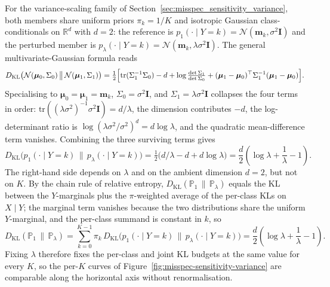 For the variance-scaling family of Section~\ref{sec:misspec_sensitivity_variance}, both members share uniform priors $\pi_k = 1/K$ and isotropic Gaussian class-conditionals on $\mathbb{R}^d$ with $d = 2$: the reference is $p_1(\cdot \mid Y{=}k) = \mathcal{N}(\mathbf{m}_k, \sigma^2 \mathbf{I})$ and the perturbed member is $p_\lambda(\cdot \mid Y{=}k) = \mathcal{N}(\mathbf{m}_k, \lambda\sigma^2 \mathbf{I})$. The general multivariate-Gaussian formula reads
\begin{equation}\label{eq:kl_gaussian_general}
    D_{\mathrm{KL}}\bigl(\mathcal{N}(\boldsymbol{\mu}_0, \Sigma_0) \,\big\|\, \mathcal{N}(\boldsymbol{\mu}_1, \Sigma_1)\bigr) = \tfrac{1}{2}\Bigl[\mathrm{tr}(\Sigma_1^{-1}\Sigma_0) - d + \log\tfrac{\det \Sigma_1}{\det \Sigma_0} + (\boldsymbol{\mu}_1 - \boldsymbol{\mu}_0)^\top \Sigma_1^{-1}(\boldsymbol{\mu}_1 - \boldsymbol{\mu}_0)\Bigr].
\end{equation}
Specialising to $\boldsymbol{\mu}_0 = \boldsymbol{\mu}_1 = \mathbf{m}_k$, $\Sigma_0 = \sigma^2 \mathbf{I}$, and $\Sigma_1 = \lambda\sigma^2 \mathbf{I}$ collapses the four terms in order: $\mathrm{tr}((\lambda\sigma^2)^{-1}\sigma^2 \mathbf{I}) = d/\lambda$, the dimension contributes $-d$, the log-determinant ratio is $\log(\lambda\sigma^2/\sigma^2)^d = d\log\lambda$, and the quadratic mean-difference term vanishes. Combining the three surviving terms gives
\begin{equation}\label{eq:kl_variance_perclass}
    D_{\mathrm{KL}}\bigl(p_1(\cdot \mid Y{=}k) \,\big\|\, p_\lambda(\cdot \mid Y{=}k)\bigr) = \tfrac{1}{2}\bigl(d/\lambda - d + d\log\lambda\bigr) = \frac{d}{2}\left(\log \lambda + \frac{1}{\lambda} - 1\right).
\end{equation}
The right-hand side depends on $\lambda$ and on the ambient dimension $d = 2$, but not on $K$. By the chain rule of relative entropy, $D_{\mathrm{KL}}(\mathbb{P}_1 \,\|\, \mathbb{P}_\lambda)$ equals the KL between the $Y$-marginals plus the $\pi$-weighted average of the per-class KLs on $X \mid Y$; the marginal term vanishes because the two distributions share the uniform $Y$-marginal, and the per-class summand is constant in $k$, so
\begin{equation}\label{eq:kl_variance_joint}
    D_{\mathrm{KL}}(\mathbb{P}_1 \,\|\, \mathbb{P}_\lambda) = \sum_{k=0}^{K-1} \pi_k\, D_{\mathrm{KL}}\bigl(p_1(\cdot \mid Y{=}k) \,\big\|\, p_\lambda(\cdot \mid Y{=}k)\bigr) = \frac{d}{2}\left(\log \lambda + \frac{1}{\lambda} - 1\right).
\end{equation}
Fixing $\lambda$ therefore fixes the per-class and joint KL budgets at the same value for every $K$, so the per-$K$ curves of Figure~\ref{fig:misspec-sensitivity-variance} are comparable along the horizontal axis without renormalisation.

